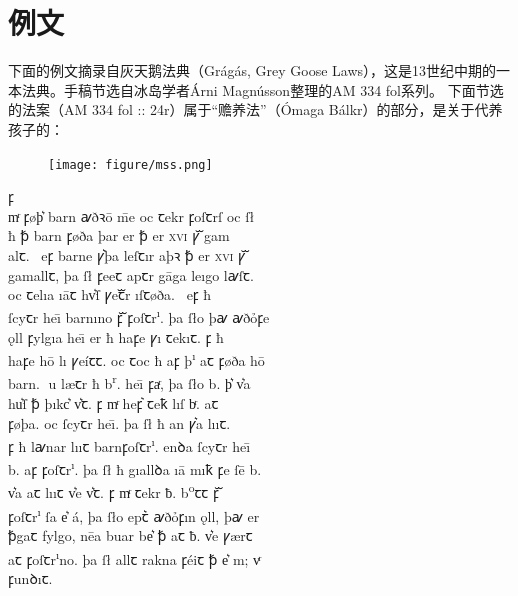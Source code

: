 \section{例文}
下面的例文摘录自灰天鹅法典（Grágás, Grey Goose Laws），这是13世纪中期的一本法典。手稿节选自冰岛学者Árni Magnússon整理的AM 334 fol系列\footnotemark。
下面节选的法案（AM 334 fol :: 24r）属于“赡养法”（Ómaga Bálkr\footnotemark）的部分，是关于代养孩子的：
\begin{multicols}{2}
    \begin{figure}[H]
        \texttt{[image: figure/mss.png]}
    \end{figure}
    \newcolumn
    \quad
    \fontsize{14pt}{14pt}\selectfont
    {\medieval
    \hfill \Eclosedunical ꝼ \\
    \noindent mͬ ꝼøþ͛ barn {\andron ꜹ}ð{\andron ꝛ}\=o \=me oc ꞇekr  ꝼoſꞇrſ oc ſ\l\\
    ħ ꝥ barn ꝼøða þar  er ꝥ er \textsc{xvi} ꝩᷓ gam\\
    alꞇ. \Eunical \nwithdescender \ eꝼ barne ꝩ͛þa leſꞇır aþ{\andron ꝛ} ꝥ er \textsc{xvi} ꝩᷓ\\
    gamallꞇ, þa ſ{\l} ꝼeeꞇ apꞇr g\=aga leıgo l{\andron ꜹ}ſꞇ.\\
    oc ꞇelıa ı\=aꞇ  hv͛ſ ꝩeꞇᷓr ı\nwithdescender ſꞇøða\nwithdescender . \Eclosedunical \nwithdescender \ eꝼ ħ\\
    ſcyꞇr he\=ı barnıno ꝼᷓ ꝼoſꞇr\textsuperscript{ı}. þa {ſ\l}o þ{\andron ꜹ} {\andron ꜹ}ðỏꝼe\\
    \k{o}ll ꝼylgıa he\=ı er ħ haꝼ\dh e ꝩı ꞇekıꞇ. \Eunical ꝼ ħ \\
    haꝼ\dh e h\=o lı{\dh} ꝩe\'{i}ꞇꞇ. oc ꞇoc ħ aꝼ þ\textsuperscript{ı} aꞇ ꝼøða h\=o \\
    barn. {\LARGE }u l\ae ꞇr ħ b\textsuperscript{r}. he\=ı ꝼaͬ, þa {ſ\l}o b. þ͛ v͛\th a\\
    hu͛ſ ꝥ
    þıkc͛ v͛ꞇ. \Eclosedunical ꝼ mͬ heꝼ͛ ꞇeꝁ  lı\dh ſ bͬ. aꞇ \\
    ꝼøþa. oc ſcyꞇr he\=ı. þa {ſ\l} ħ an ꝩ͛a lı\dh ıꞇ.\\
    \Eclosedunical ꝼ ħ l{\andron ꜹ}nar lı\dh ıꞇ barnꝼoſꞇr\textsuperscript{ı}. enꝺa ſcyꞇr he\=ı \\
    b. aꝼ ꝼoſꞇr\textsuperscript{ı}. þa {ſ\l} ħ gıallꝺa ı\=a mıꝁ ꝼe ſ\=e b.\\
    v͛\dh a aꞇ lı\dh ıꞇ v͛e v͛ꞇ. \Eclosedunical ꝼ mͬ ꞇekr ƀ. b\textsuperscript{o}ꞇꞇ ꝼᷓ \\
    ꝼoſꞇr\textsuperscript{ı} ſa e͛ \'{a}, þa {ſ\l}o epꞇ͛ {\andron ꜹ}ðỏꝼın \k{o}ll, þ{\andron ꜹ} er \\
    ꝥgaꞇ fylg\dh o, n\=ea buar be͛ ꝥ aꞇ ƀ. v͛e  ꝩ\ae rꞇ\\
    aꞇ ꝼoſꞇr\textsuperscript{ı}no. þa {ſ\l} allꞇ rakna ꝼ\'{e}iꞇ ꝥ e͛ m; vͬ\\
    ꝼunꝺıꞇ.
    }
\end{multicols}
